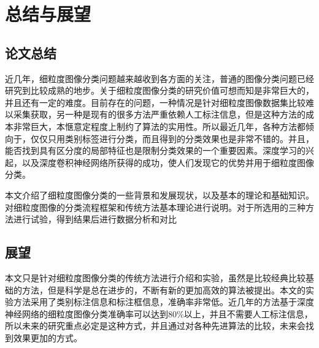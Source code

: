 \chapter{总结与展望}
\label{cha:zongjiezhanwang}

\section{论文总结}
\label{sec:zongjie}
近几年，细粒度图像分类问题越来越收到各方面的关注，普通的图像分类问题已经研究到比较成熟的地步。关于细粒度图像分类的研究价值可想而知是非常巨大的，并且还有一定的难度。目前存在的问题，一种情况是针对细粒度图像数据集比较难以采集获取，另一种是现有的很多方法严重依赖人工标注信息，但是这种方法的成本非常巨大，本惬意定程度上制约了算法的实用性。所以最近几年，各种方法都倾向于，仅仅只用类别标签进行分类，而且得到的分类效果也是非常不错的。并且，能否找到具有区分度的局部特征也是限制分类效果的一个重要因素。深度学习的兴起，以及深度卷积神经网络所获得的成功，使人们发现它的优势并用于细粒度图像分类。
 
本文介绍了细粒度图像分类的一些背景和发展现状，以及基本的理论和基础知识。对细粒度图像的分类流程框架和传统方法基本理论进行说明。对于所选用的三种方法进行试验，得到结果后进行数据分析和对比
\section{展望}
\label{sec:zhanwang}
本文只是针对细粒度图像分类的传统方法进行介绍和实验，虽然是比较经典比较基础的方法，但是科学是总在进步的，不断有新的更加高效的算法被提出。本文的实验方法采用了类别标注信息和标注框信息，准确率非常低。近几年的方法基于深度神经网络的细粒度图像分类准确率可以达到80\%以上，并且不需要人工标注信息，所以未来的研究重点必定是这种方式，并且通过对各种先进算法的比较，未来会找到效果更加的方式。







